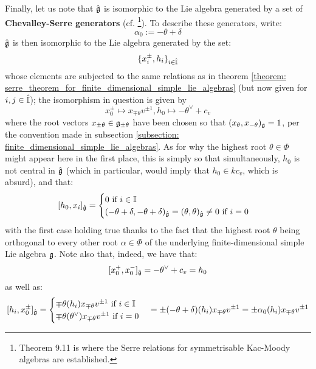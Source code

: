         Finally, let us note that $\hat{\mathfrak{g}}$ is isomorphic to the Lie algebra generated by a set of \textbf{Chevalley-Serre generators} (cf. \cite[Theorems 1.2, 1.4, and 9.11]{kac_infinite_dimensional_lie_algebras}\footnote{Theorem 9.11 is where the Serre relations for symmetrisable Kac-Moody algebras are established.}). To describe these generators, write:
            $$\alpha_0 := -\theta + \delta$$
        $\hat{\mathfrak{g}}$ is then isomorphic to the Lie algebra generated by the set:
            $$\{x_i^{\pm}, h_i\}_{i \in \hat{\mathbb{I}}}$$
        whose elements are subjected to the same relations as in theorem \ref{theorem: serre_theorem_for_finite_dimensional_simple_lie_algebras} (but now given for $i, j \in \hat{\mathbb{I}}$); the isomorphism in question is given by
            $$x_0^{\pm} \mapsto x_{\mp \theta} v^{\pm 1}, h_0 \mapsto -\theta^{\vee} + c_v$$
        where the root vectors $x_{\pm \theta} \in \mathfrak{g}_{\pm \theta}$ have been chosen so that $(x_{\theta}, x_{-\theta})_{\mathfrak{g}} = 1$, per the convention made in subsection \ref{subsection: finite_dimensional_simple_lie_algebras}. As for why the highest root $\theta \in \Phi$ might appear here in the first place, this is simply so that simultaneously, $h_0$ is not central in $\hat{\mathfrak{g}}$ (which in particular, would imply that $h_0 \in k c_v$, which is absurd), and that:
            $$
                [h_0, x_i]_{\hat{\mathfrak{g}}} =
                \begin{cases}
                    \text{$0$ if $i \in \mathbb{I}$}
                    \\
                    \text{$(-\theta + \delta, -\theta + \delta)_{\hat{\mathfrak{g}}} = (\theta, \theta)_{\hat{\mathfrak{g}}} \not = 0$ if $i = 0$}
                \end{cases}
            $$
        with the first case holding true thanks to the fact that the highest root $\theta$ being orthogonal to every other root $\alpha \in \Phi$ of the underlying finite-dimensional simple Lie algebra $\mathfrak{g}$. Note also that, indeed, we have that:
            $$[x_0^+, x_0^-]_{\hat{\mathfrak{g}}} = -\theta^{\vee} + c_v = h_0$$
        as well as:
            $$
                [h_i, x_0^{\pm}]_{\hat{\mathfrak{g}}}
                =
                \begin{cases}
                    \text{$\mp \theta(h_i) x_{\mp \theta} v^{\pm 1}$ if $i \in \mathbb{I}$}
                    \\
                    \text{$\mp \theta(\theta^{\vee}) x_{\mp \theta} v^{\pm 1}$ if $i = 0$}
                \end{cases}
                =
                \pm (-\theta + \delta)(h_i) x_{\mp \theta} v^{\pm 1} = \pm \alpha_0(h_i) x_{\mp \theta} v^{\pm 1}
            $$
